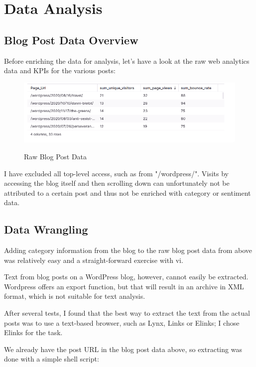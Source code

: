 %
%

\pagebreak
\section{Data Analysis}

\onehalfspacing

\subsection{Blog Post Data Overview}

Before enriching the data for analysis, let's have a look at the raw web analytics data and KPIs for the various posts:

\begin{figure}[H]
\centering
\caption {Raw Blog Post Data}
\includegraphics[width=\linewidth]{images/analysis-raw.png}
\label{fig:analysisRaw}
\end{figure}

I have excluded all top-level access, such as from "/wordpress/". Visits by accessing the blog itself and then scrolling down can unfortunately not be attributed to a certain post and thus not be enriched with category or sentiment data.

\subsection{Data Wrangling}

Adding category information from the blog to the raw blog post data from above was relatively easy and a straight-forward exercise with vi.

Text from blog posts on a WordPress blog, however, cannot easily be extracted. Wordpress offers an export function, but that will result in an archive in XML format, which is not suitable for text analysis.

After several tests, I found that the best way to extract the text from the actual posts was to use a text-based browser, such as Lynx, Links or Elinks; I chose Elinks for the task.

We already have the post URL in the blog post data above, so extracting was done with a simple shell script:

